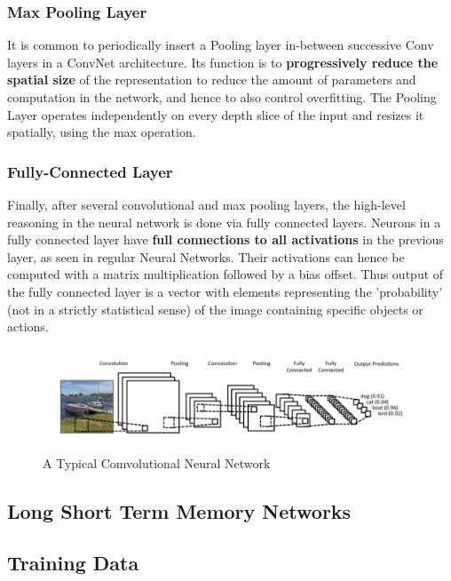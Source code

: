 \documentclass{article}
\begin{document}
				\subsubsection{Max Pooling Layer}
					It is common to periodically insert a Pooling layer in-between successive Conv layers in a ConvNet architecture. Its function is to \textbf{progressively reduce the spatial size} of the representation to reduce the amount of parameters and computation in the network, and hence to also control overfitting. The Pooling Layer operates independently on every depth slice of the input and resizes it spatially, using the max operation.
				\subsubsection{Fully-Connected Layer}
					Finally, after several convolutional and max pooling layers, the high-level reasoning in the neural network is done via fully connected layers. Neurons in a fully connected layer have \textbf{full connections to all activations} in the previous layer, as seen in regular Neural Networks. Their activations can hence be computed with a matrix multiplication followed by a bias offset. Thus output of the fully connected layer is a vector with elements representing the 'probability' (not in a strictly statistical sense) of the image containing specific objects or actions.
				\begin{figure}[ht!]
					\includegraphics[width=14cm]{conv.png}
					\caption{A Typical Comvolutional Neural Network\label{fig4}}
				\end{figure}
			\subsection{Long Short Term Memory Networks}
				


			\subsection{Training Data}
				
\end{document}
